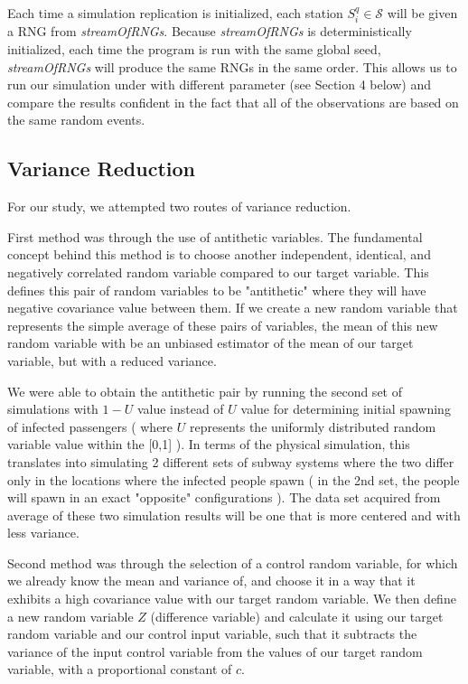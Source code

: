 \documentclass[12pt]{article}
\begin{document}
Each time a simulation replication is initialized, each station $S_i^q \in \mathcal{S}$ will be given a RNG from \emph{streamOfRNGs}.
Because \emph{streamOfRNGs} is deterministically initialized, each time the program is run with the same global seed, \emph{streamOfRNGs} will produce the same RNGs in the same order.
This allows us to run our simulation under with different parameter (see Section 4 below) and compare the results confident in the fact that all of the observations are based on the same random events.

\subsection{Variance Reduction}

For our study, we attempted two routes of variance reduction.

First method was through the use of antithetic variables. The fundamental concept behind this method is to choose another independent, identical, and negatively correlated random variable compared to our target variable. This defines this pair of random variables to be "antithetic" where they will have negative covariance value between them. If we create a new random variable that represents the simple average of these pairs of variables, the mean of this new random variable with be an unbiased estimator of the mean of our target variable, but with a reduced variance.

We were able to obtain the antithetic pair by running the second set of simulations with $1-U$ value instead of $U$ value for determining initial spawning of infected passengers ( where $U$ represents the uniformly distributed random variable value within the [0,1] ). In terms of the physical simulation, this translates into simulating 2 different sets of subway systems where the two differ only in the locations where the infected people spawn ( in the 2nd set, the people will spawn in an exact "opposite" configurations ). The data set acquired from average of these two simulation results will be one that is more centered and with less variance.

Second method was through the selection of a control random variable, for which we already know the mean and variance of, and choose it in a way that it exhibits a high covariance value with our target random variable. We then define a new random variable $Z$ (difference variable) and calculate it using our target random variable and our control input variable, such that it subtracts the variance of the input control variable from the values of our target random variable, with a proportional constant of $c$.
\end{document}
